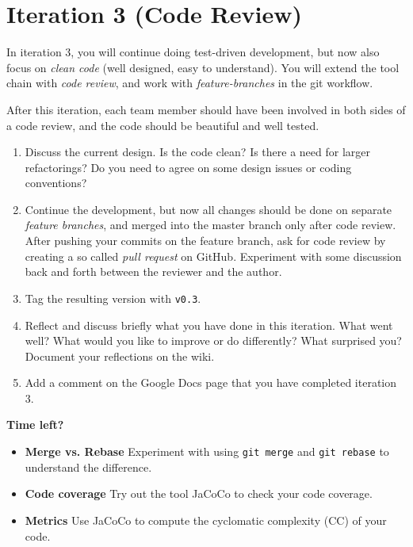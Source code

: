 \documentclass[swedish,english]{article}
\begin{document}
\newpage


\section*{Iteration 3 (Code Review)}
In iteration 3, you will continue doing test-driven development, but now also focus on \emph{clean code} (well designed, easy to understand). You will extend the tool chain with \emph{code review}, and work with \emph{feature-branches} in the git workflow.

After this iteration, each team member should have been involved in both sides of a code review, and the code should be beautiful and well tested.

\begin{enumerate}
\item Discuss the current design. Is the code clean? Is there a need for larger refactorings? Do you need to agree on some design issues or coding conventions?
\item Continue the development, but now all changes should be done on separate \emph{feature branches}, and merged into the master branch only after code review. After pushing your commits on the feature branch, ask for code review by creating a so called \emph{pull request} on GitHub. Experiment with some discussion back and forth between the reviewer and the author.
\item Tag the resulting version with \verb'v0.3'.
\item Reflect and discuss briefly what you have done in this iteration. What went well? What would you like to improve or do differently? What surprised you? Document your reflections on the wiki.
\item Add a comment on the Google Docs page that you have completed iteration 3.
\end{enumerate}

\textbf{Time left?}

\begin{itemize}
\item \textbf{Merge vs. Rebase} Experiment with using \verb'git merge' and \verb'git rebase' to understand the difference.
\item \textbf{Code coverage} Try out the tool JaCoCo to check your code coverage. 
\item \textbf{Metrics} Use JaCoCo to compute the cyclomatic complexity (CC) of your code.
\end{itemize}

\newpage
\end{document}
